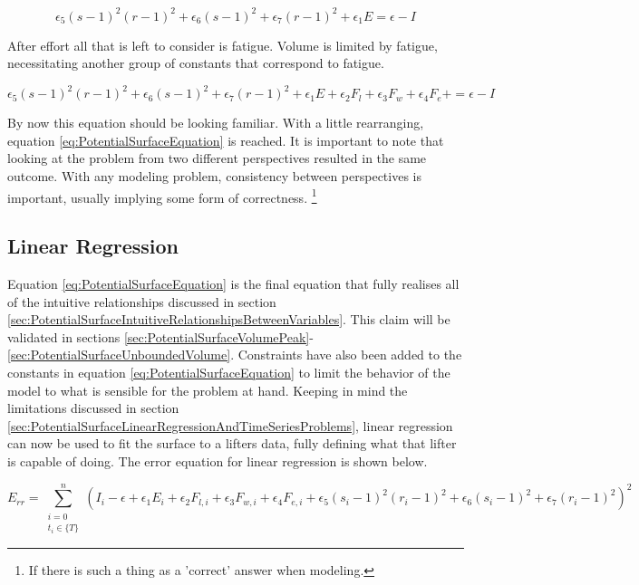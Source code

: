\begin{equation*}
    \epsilon_5(s-1)^2(r-1)^2+\epsilon_6(s-1)^2+\epsilon_7(r-1)^2+\epsilon_1 E=\epsilon-I
\end{equation*}

After effort all that is left to consider is fatigue. Volume is limited by fatigue, necessitating another group of constants that correspond to fatigue.

\begin{equation*}
    \epsilon_5(s-1)^2(r-1)^2+\epsilon_6(s-1)^2+\epsilon_7(r-1)^2+\epsilon_1 E+\epsilon_2 F_l+\epsilon_3 F_w+\epsilon_4 F_e+=\epsilon-I
\end{equation*}

By now this equation should be looking familiar. With a little rearranging, equation \ref{eq:PotentialSurfaceEquation} is reached. It is important to note that looking at the problem from two different perspectives resulted in the same outcome. With any modeling problem, consistency between perspectives is important, usually implying some form of correctness. \footnote{If there is such a thing as a 'correct' answer when modeling.}

\subsection{Linear Regression}
\label{sec:PotentialSurfaceLinearRegression}

Equation \ref{eq:PotentialSurfaceEquation} is the final equation that fully realises all of the intuitive relationships discussed in section \ref{sec:PotentialSurfaceIntuitiveRelationshipsBetweenVariables}. This claim will be validated in sections \ref{sec:PotentialSurfaceVolumePeak}-\ref{sec:PotentialSurfaceUnboundedVolume}. Constraints have also been added to the constants in equation \ref{eq:PotentialSurfaceEquation} to limit the behavior of the model to what is sensible for the problem at hand. Keeping in mind the limitations discussed in section \ref{sec:PotentialSurfaceLinearRegressionAndTimeSeriesProblems}, linear regression can now be used to fit the surface to a lifters data, fully defining what that lifter is capable of doing. The error equation for linear regression is shown below.

\begin{equation*}
    E_{rr}=\sum_{
            \substack{i=0\\ t_i\in \{ T \}}
        }^n \left(
        I_i
        -\epsilon
        +\epsilon_1 E_i
        +\epsilon_2 F_{l,i}
        +\epsilon_3 F_{w,i}
        +\epsilon_4 F_{e,i}
        +\epsilon_5 (s_i-1)^2(r_i-1)^2
        +\epsilon_6 (s_i-1)^2
        +\epsilon_7 (r_i-1)^2
    \right)^2
\end{equation*}

